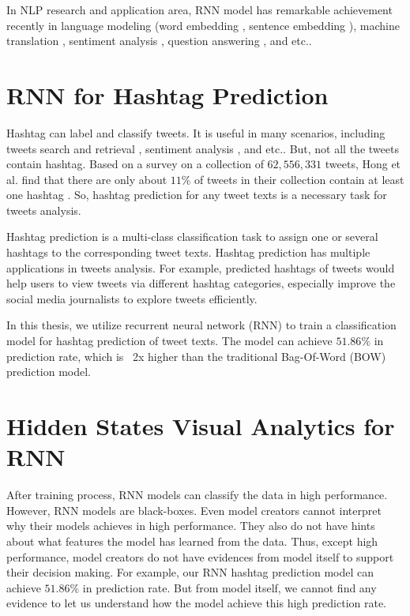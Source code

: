 In NLP research and application area, RNN model has remarkable achievement recently in language modeling (word embedding \cite{Mikolov2013}, sentence embedding \cite{Kiros2015}), machine translation \cite{Sutskever2014}, sentiment analysis \cite{Socher2013}, question answering \cite{Iyyer2014}, and etc.. 

\section{RNN for Hashtag Prediction}

Hashtag can label and classify tweets. It is useful in many scenarios, including tweets search and retrieval \cite{Efron2010}, sentiment analysis \cite{Davidov2010}, and etc.. But, not all the tweets contain hashtag. Based on a survey on a collection of $62,556,331$ tweets, Hong et al. find that there are only about $11\%$ of tweets in their collection contain at least one hashtag \cite{Hong2011a}. So, hashtag prediction for any tweet texts is a necessary task for tweets analysis. 

Hashtag prediction is a multi-class classification task to assign one or several hashtags to the corresponding tweet texts. Hashtag prediction has multiple applications in tweets analysis.  For example, predicted hashtags of tweets would help users to view tweets via different hashtag categories, especially improve the social media journalists to explore tweets efficiently. 

In this thesis, we utilize recurrent neural network (RNN) to train a classification model for hashtag prediction of tweet texts. The model can achieve $51.86\%$ in prediction rate, which is ~2x higher than the traditional Bag-Of-Word (BOW) prediction model.

\section{Hidden States Visual Analytics for RNN}

After training process, RNN models can classify the data in high performance. However, RNN models are black-boxes. Even model creators cannot interpret why their models achieves in high performance. They also do not have hints about what features the model has learned from the data. Thus, except high performance, model creators do not have evidences from model itself to support their decision making.  For example, our RNN hashtag prediction model can achieve $51.86\%$ in prediction rate. But from model itself, we cannot find any evidence to let us understand how the model achieve this high prediction rate. 

